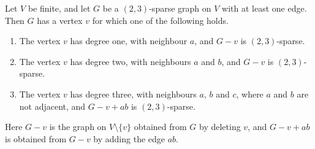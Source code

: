 \begin{theorem}
  \label{thm:isSparse-exists-typeI-or-typeII-reverse}
  \leanok
  Let $V$ be finite, and let $G$ be a $(2,3)$-sparse graph on $V$ with
  at least one edge. Then $G$ has a vertex $v$ for which one of the
  following holds.
  \begin{enumerate}
    \item The vertex $v$ has degree one, with neighbour $a$, and
      $G - v$ is $(2,3)$-sparse.
    \item The vertex $v$ has degree two, with neighbours $a$ and $b$,
      and $G - v$ is $(2,3)$-sparse.
    \item The vertex $v$ has degree three, with neighbours $a$, $b$ and
      $c$, where $a$ and $b$ are not adjacent, and $G - v + ab$ is
      $(2,3)$-sparse.
  \end{enumerate}
  Here $G - v$ is the graph on $V \setminus \{v\}$ obtained from $G$
  by deleting $v$, and $G - v + ab$ is obtained from $G - v$ by adding
  the edge $ab$.
\end{theorem}
